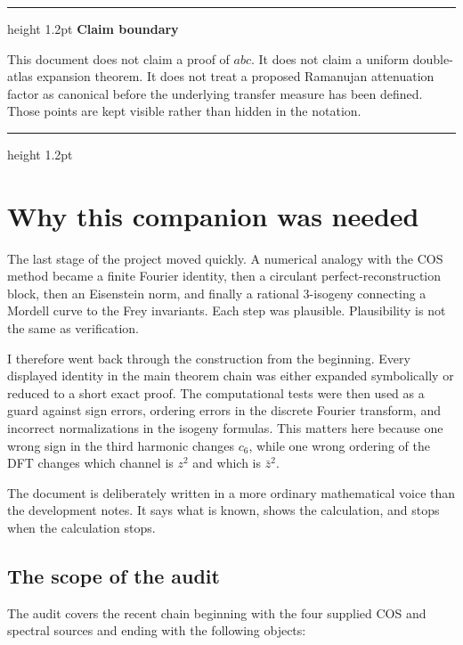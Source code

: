 \documentclass[11pt]{article}
\newenvironment{statusbox}[2]{%
  \par\medskip\noindent
  \begin{minipage}{\textwidth}
  \def\statuscolor{#1}%
  \color{\statuscolor}\hrule height 1.2pt\relax
  \vspace{0.45em}
  {\bfseries #2}\par\smallskip
  \color{Ink}%
}{%
  \par\vspace{0.35em}
  \color{\statuscolor}\hrule height 1.2pt\relax
  \end{minipage}
  \par\medskip
}
\begin{document}
\begin{statusbox}{Red}{Claim boundary}
This document does not claim a proof of $abc$.  It does not claim a uniform double-atlas expansion theorem.  It does not treat a proposed Ramanujan attenuation factor as canonical before the underlying transfer measure has been defined.  Those points are kept visible rather than hidden in the notation.
\end{statusbox}

\tableofcontents
\clearpage

\section{Why this companion was needed}

The last stage of the project moved quickly.  A numerical analogy with the COS method became a finite Fourier identity, then a circulant perfect-reconstruction block, then an Eisenstein norm, and finally a rational $3$-isogeny connecting a Mordell curve to the Frey invariants.  Each step was plausible.  Plausibility is not the same as verification.

I therefore went back through the construction from the beginning.  Every displayed identity in the main theorem chain was either expanded symbolically or reduced to a short exact proof.  The computational tests were then used as a guard against sign errors, ordering errors in the discrete Fourier transform, and incorrect normalizations in the isogeny formulas.  This matters here because one wrong sign in the third harmonic changes $c_6$, while one wrong ordering of the DFT changes which channel is $z^2$ and which is $\bar z^2$.

The document is deliberately written in a more ordinary mathematical voice than the development notes.  It says what is known, shows the calculation, and stops when the calculation stops.

\subsection{The scope of the audit}

The audit covers the recent chain beginning with the four supplied COS and spectral sources and ending with the following objects:
\end{document}
